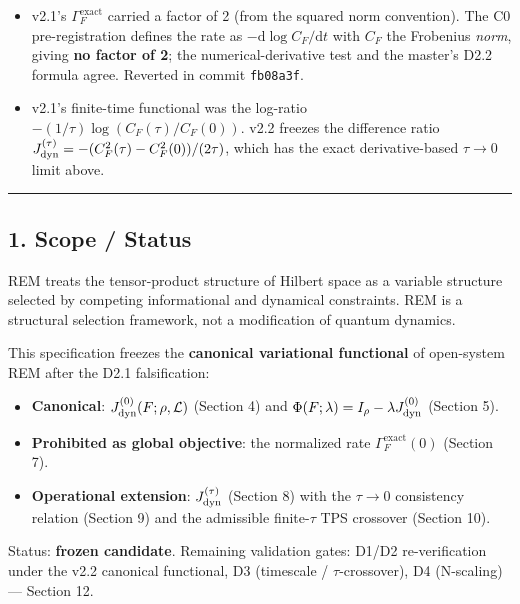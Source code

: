 \documentclass[
]{article}
\providecommand{\tightlist}{%
  \setlength{\itemsep}{0pt}\setlength{\parskip}{0pt}}
\begin{document}
\begin{itemize}
\tightlist
\item
  v2.1's \(\Gamma_F^{\mathrm{exact}}\) carried a factor of 2 (from the
  squared norm convention). The C0 pre-registration defines the rate as
  \(-\mathrm{d}\log C_F/\mathrm{d}t\) with \(C_F\) the Frobenius
  \emph{norm}, giving \textbf{no factor of 2}; the numerical-derivative
  test and the master's D2.2 formula agree. Reverted in commit
  \texttt{fb08a3f}.
\item
  v2.1's finite-time functional was the log-ratio
  \(-(1/\tau)\log(C_F(\tau)/C_F(0))\). v2.2 freezes the difference ratio
  \(J_{\rm dyn}^{(\tau)} = -(C_F^2(\tau)-C_F^2(0))/(2\tau)\), which has
  the exact derivative-based \(\tau\to0\) limit above.
\end{itemize}

\begin{center}\rule{0.5\linewidth}{0.5pt}\end{center}

\subsection{1. Scope / Status}\label{scope-status}

REM treats the tensor-product structure of Hilbert space as a variable
structure selected by competing informational and dynamical constraints.
REM is a structural selection framework, not a modification of quantum
dynamics.

This specification freezes the \textbf{canonical variational functional}
of open-system REM after the D2.1 falsification:

\begin{itemize}
\tightlist
\item
  \textbf{Canonical}: \(J_{\rm dyn}^{(0)}(F;\rho,\mathcal L)\) (Section
  4) and \(\Phi(F;\lambda) = I_\rho - \lambda J_{\rm dyn}^{(0)}\)
  (Section 5).
\item
  \textbf{Prohibited as global objective}: the normalized rate
  \(\Gamma_F^{\mathrm{exact}}(0)\) (Section 7).
\item
  \textbf{Operational extension}: \(J_{\rm dyn}^{(\tau)}\) (Section 8)
  with the \(\tau\to0\) consistency relation (Section 9) and the
  admissible finite-\(\tau\) TPS crossover (Section 10).
\end{itemize}

Status: \textbf{frozen candidate}. Remaining validation gates: D1/D2
re-verification under the v2.2 canonical functional, D3 (timescale /
\(\tau\)-crossover), D4 (N-scaling) --- Section 12.
\end{document}

